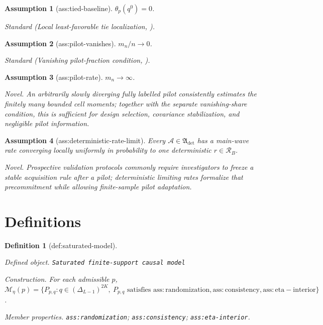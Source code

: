 \documentclass{article}
\newtheorem{assumption}{Assumption}
\newtheorem{definition}{Definition}
\begin{document}
\begin{assumption}[ass:tied-baseline]\label{ass:tied-baseline}
\(\theta_p(q^0)=0\).
\par\smallskip\noindent\emph{Standard} (Local least-favorable tie localization, \cite{HiranoPorter2009AsymptoticsTreatmentRules}).
\end{assumption}

\begin{assumption}[ass:pilot-vanishes]\label{ass:pilot-vanishes}
\(m_n/n\to0\).
\par\smallskip\noindent\emph{Standard} (Vanishing pilot-fraction condition, \cite{Kato2026BestArm}).
\end{assumption}

\begin{assumption}[ass:pilot-rate]\label{ass:pilot-rate}
\(m_n\to\infty\).
\par\smallskip\noindent\emph{Novel.} An arbitrarily slowly diverging fully labelled pilot consistently estimates the finitely many bounded cell moments; together with the separate vanishing-share condition, this is sufficient for design selection, covariance stabilization, and negligible pilot information.
\end{assumption}

\begin{assumption}[ass:deterministic-rate-limit]\label{ass:deterministic-rate-limit}
Every \(\mathcal A\in\mathfrak A_{\mathrm{det}}\) has a main-wave rate converging locally uniformly in probability to one deterministic \(r\in\mathcal R_B\).
\par\smallskip\noindent\emph{Novel.} Prospective validation protocols commonly require investigators to freeze a stable acquisition rule after a pilot; deterministic limiting rates formalize that precommitment while allowing finite-sample pilot adaptation.
\end{assumption}

\section{Definitions}

\begin{definition}[def:saturated-model]\label{def:saturated-model}
\par\smallskip\noindent\emph{Defined object.} \texttt{Saturated finite-\allowbreak{}support causal model}
\par\smallskip\noindent\emph{Construction.} For each admissible \(p\), \(\mathcal M_\eta(p)=\{P_{p,q}:q\in(\Delta_{L-1})^{2K},\ P_{p,q}\text{ satisfies }\mathrm{ass:randomization},\mathrm{ass:consistency},\mathrm{ass:eta-interior}\}\).
\par\smallskip\noindent\emph{Member properties.} \texttt{ass:\allowbreak{}randomization}; \texttt{ass:\allowbreak{}consistency}; \texttt{ass:\allowbreak{}eta-\allowbreak{}interior}.
\end{definition}
\end{document}
